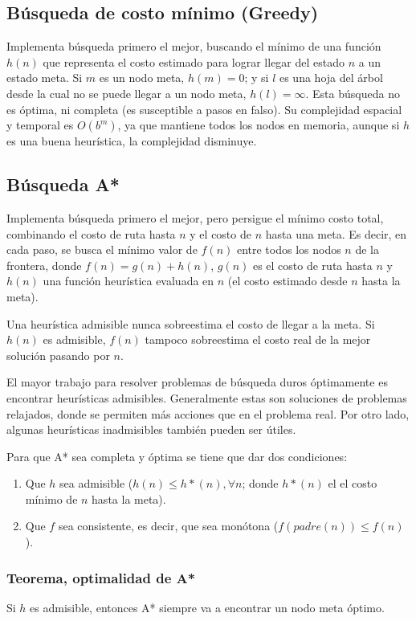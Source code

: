 \documentclass[a4paper,10pt]{paper}
\begin{document}
\subsection{Búsqueda de costo mínimo (Greedy)}
Implementa búsqueda primero el mejor, buscando el mínimo de una función $h(n)$
que representa el costo estimado para lograr llegar del estado $n$ a un estado
meta. Si $m$ es un nodo meta, $h(m) = 0$; y si $l$ es una hoja del árbol desde
la cual no se puede llegar a un nodo meta, $h(l) = \infty$. Esta búsqueda no 
es óptima, ni completa (es susceptible a pasos en falso). Su complejidad
espacial y temporal es $O(b^m)$, ya que mantiene todos los nodos en memoria,
aunque si $h$ es una buena heurística, la complejidad disminuye.

\subsection{Búsqueda A*}
Implementa búsqueda primero el mejor, pero persigue el mínimo costo total,
combinando el costo de ruta hasta $n$ y el costo de $n$ hasta una meta. Es
decir, en cada paso, se busca el mínimo valor de $f(n)$ entre todos los nodos
$n$ de la frontera, donde $f(n) = g(n) + h(n)$, $g(n)$ es el costo de ruta
hasta $n$ y $h(n)$ una función heurística evaluada en $n$ (el costo estimado
desde $n$ hasta la meta).

Una heurística admisible nunca sobreestima el costo de llegar a la meta. Si
$h(n)$ es admisible, $f(n)$ tampoco sobreestima el costo real de la mejor
solución pasando por $n$.

El mayor trabajo para resolver problemas de búsqueda duros óptimamente es
encontrar heurísticas admisibles. Generalmente estas son soluciones de problemas
relajados, donde se permiten más acciones que en el problema real. Por otro
lado, algunas heurísticas inadmisibles también pueden ser útiles.

Para que A* sea completa y óptima se tiene que dar dos condiciones:
\begin{enumerate}
    \item Que $h$ sea admisible ($h(n) \leq h*(n), \forall n$; donde $h*(n)$ el
    el costo mínimo de $n$ hasta la meta).
    \item Que $f$ sea consistente, es decir, que sea monótona
    ($f(padre(n)) \leq f(n)$).
\end{enumerate}

\subsubsection{Teorema, optimalidad de A*}
Si $h$ es admisible, entonces A* siempre va a encontrar un nodo meta óptimo.
\end{document}
